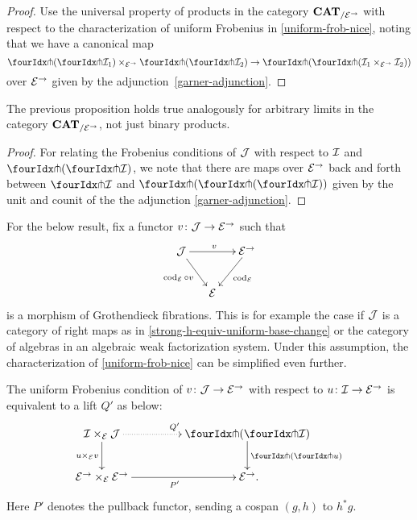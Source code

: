 \documentclass[reqno,10pt,a4paper,oneside,draft]{amsart}
\begin{document}
\begin{proof}
Use the universal property of products in the category $\CAT_{/\cal{E}^\to}$ with respect to the characterization of uniform Frobenius in \cref{uniform-frob-nice}, noting that we have a canonical map
\[
\liftl{(\liftr{\cal{I}_1})} \times_{\cal{E}^\to} \liftl{(\liftr{\cal{I}_2})} \to \liftl{(\liftr{(\cal{I}_1 \times_{\cal{E}^\to} \cal{I}_2)})}
\]
over $\cal{E}^\to$ given by the adjunction~\eqref{garner-adjunction}.
\end{proof}

\begin{remark} \label{uniform-frobenius-limit-u}
The previous proposition holds true analogously for arbitrary limits in the category $\CAT_{/\cal{E}^\to}$, not just binary products.
\end{remark}

\begin{proof}
For relating the Frobenius conditions of $\cal{J}$ with respect to $\cal{I}$ and $\liftl{(\liftr{\cal{I}})}$, we note that there are maps over $\cal{E}^\to$ back and forth between $\liftr{\cal{I}}$ and $\liftr{(\liftl{(\liftr{\cal{I}})})}$ given by the unit and counit of the the adjunction \eqref{garner-adjunction}.

\end{proof}

For the below result, fix a functor $v \co \cal{J} \to \cal{E}^\to$ such that
\begin{equation} \label{uniform-frob:comprehension}
\begin{gathered}
\xymatrix@C-1em{
  \cal{J}
  \ar[rr]^{v}
  \ar[dr]_{\cod_{\cal{E}} \cc v}
&&
  \cal{E}^\to
  \ar[dl]^{\cod_{\cal{E}}}
\\&
  \cal{E}
}
\end{gathered}
\end{equation}
is a morphism of Grothendieck fibrations.
This is for example the case if $\cal{J}$ is a category of right maps as in \cref{strong-h-equiv-uniform-base-change} or the category of algebras in an algebraic weak factorization system.
Under this assumption, the characterization of \cref{uniform-frob-nice} can be simplified even further.

\begin{proposition}
\label{uniform-frob-even-nicer}
The uniform Frobenius condition of $v \co \cal{J} \to \cal{E}^\to$ with respect to $u \co \cal{I} \to \cal{E}^\to$ is equivalent to a lift $Q'$ as below:
\begin{equation} \label{uniform-frob-even-nicer:lift}
\begin{gathered}
\xymatrix@C+2em{
  \cal{I} \times_{\cal{E}} \cal{J}
  \ar@{.>}[r]^{Q'}
  \ar[d]_{u \times_{\cal{E}} v}
&
  \liftl{(\liftr{\cal{I}})}
  \ar[d]^{\liftl{(\liftr{u})}}
\\
  \cal{E}^\to \times_{\cal{E}} \cal{E}^\to
  \ar[r]_{P'}
&
  \cal{E}^\to
\rlap{.}}
\end{gathered}
\end{equation}
Here $P'$ denotes the pullback functor, sending a cospan $(g, h)$ to $h^* g$.
\end{proposition}
\end{document}
